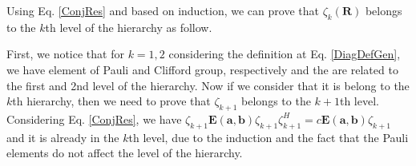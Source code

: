 \noindent Using Eq. \eqref{ConjRes} and based on induction, we can prove that $\zeta_k(\mathbf{R})$ belongs to the $k$th level of the hierarchy as follow.


\noindent First, we notice that for $k=1, 2$ considering the definition at Eq. \eqref{DiagDefGen}, we have element of Pauli and Clifford group, respectively and the are related to the first and 2nd level of the hierarchy. Now if we consider that it is belong to the $k$th hierarchy, then we need to prove that $\zeta_{k+1}$ belongs to the $k+1$th level. Considering Eq. \eqref{ConjRes}, we have $\zeta_{k+1} \mathbf{E}\left(\mathbf{a, b}\right)\zeta_{k+1} \zeta_{k+1}^H = c \mathbf{E}\left(\mathbf{a, b}\right)\zeta_{k+1} $ and it is already in the $k$th level, due to the induction and the fact that the Pauli elements do not affect the level of the hierarchy.


